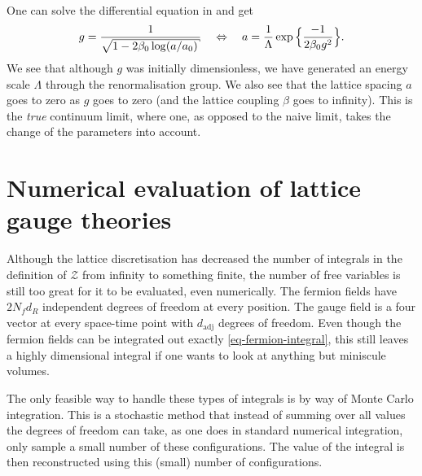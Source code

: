 %
One can solve the differential equation in  and get
%
\begin{equation} \label{eq-running-coupling}
  g = \frac{1}{\sqrt{1 - 2\beta_0 \log (a/a_0)}}
    \hskip1em\Leftrightarrow\hskip1em
    a = \frac{1}{\Lambda} \exp\Big\{\frac{-1}{2\beta_0 g^2}\Big\} .
\end{equation}
%
We see that although $g$ was initially dimensionless, we have generated an
energy scale $\Lambda$ through the renormalisation group. We also see that the
lattice spacing $a$ goes to zero as $g$ goes to zero (and the lattice coupling
$\beta$ goes to infinity). This is the \emph{true} continuum limit, where one, as
opposed to the naive limit, takes the change of the parameters into account.

\section{Numerical evaluation of lattice gauge theories}
\label{sec-numerical_eval}

Although the lattice discretisation has decreased the number of integrals in the
definition of $\mathcal{Z}$ from infinity to something finite, the number of free
variables is still too great for it to be evaluated, even numerically. The
fermion fields have $2 N_f d_R$ independent degrees of freedom at every
position. The gauge field is a four vector at every space-time point with
$d_{\text{adj}}$ degrees of freedom. Even though the fermion fields can be
integrated out exactly \eqref{eq-fermion-integral}, this still leaves a highly
dimensional integral if one wants to look at anything but miniscule volumes.

The only feasible way to handle these types of integrals is by way of Monte
Carlo integration. This is a stochastic method that instead of summing over all
values the degrees of freedom can take, as one does in standard numerical
integration, only sample a small number of these configurations. The value of
the integral is then reconstructed using this (small) number of configurations.

